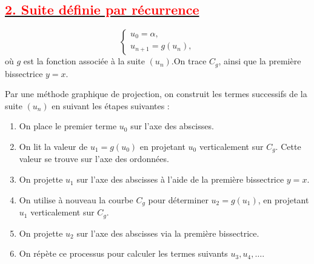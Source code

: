 \documentclass{article}
\begin{document}

\subsection*{\underline{\textbf{\textcolor{red}{2. Suite définie par récurrence}}}} 

\[
\begin{cases}
u_0 = \alpha, \\
u_{n+1} = g(u_n),
\end{cases}
\]
où \( g \) est la fonction associée à la suite \((u_n)\).On trace \( C_g \), ainsi que la première bissectrice \( y = x \).  

Par une méthode graphique de projection, on construit les termes successifs de la suite \((u_n)\) en suivant les étapes suivantes :  

\begin{enumerate}
    \item On place le premier terme \( u_0 \) sur l’axe des abscisses.  
    \item On lit la valeur de \( u_1 = g(u_0) \) en projetant \( u_0 \) verticalement sur \( C_g \). Cette valeur se trouve sur l’axe des ordonnées.  
    \item On projette \( u_1 \) sur l’axe des abscisses à l’aide de la première bissectrice \( y = x \).  
    \item On utilise à nouveau la courbe \( C_g \) pour déterminer \( u_2 = g(u_1) \), en projetant \( u_1 \) verticalement sur \( C_g \).  
    \item On projette \( u_2 \) sur l’axe des abscisses via la première bissectrice.  
    \item On répète ce processus pour calculer les termes suivants \( u_3, u_4, \dots \).  
\end{enumerate}
\end{document}

